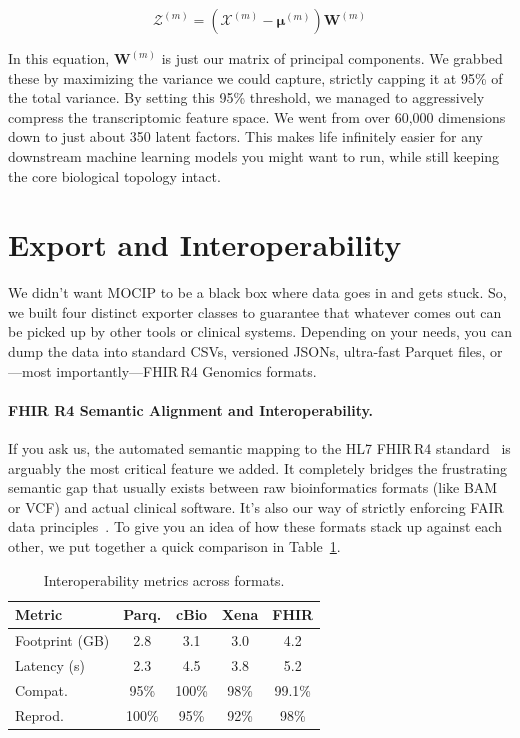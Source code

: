\documentclass[runningheads]{llncs}
\begin{document}
\begin{equation}
\mathcal{Z}^{(m)} = (\mathcal{X}^{(m)} - \mathbf{\mu}^{(m)}) \mathbf{W}^{(m)}
\end{equation}

In this equation, $\mathbf{W}^{(m)}$ is just our matrix of principal components. We grabbed these by maximizing the variance we could capture, strictly capping it at 95\% of the total variance. By setting this 95\% threshold, we managed to aggressively compress the transcriptomic feature space. We went from over 60,000 dimensions down to just about 350 latent factors. This makes life infinitely easier for any downstream machine learning models you might want to run, while still keeping the core biological topology intact.

\section{Export and Interoperability}

We didn't want MOCIP to be a black box where data goes in and gets stuck. So, we built four distinct exporter classes to guarantee that whatever comes out can be picked up by other tools or clinical systems. Depending on your needs, you can dump the data into standard CSVs, versioned JSONs, ultra-fast Parquet files, or---most importantly---FHIR\,R4 Genomics formats.

\paragraph{FHIR R4 Semantic Alignment and Interoperability.}
If you ask us, the automated semantic mapping to the HL7 FHIR\,R4 standard~\cite{hl7fhir} is arguably the most critical feature we added. It completely bridges the frustrating semantic gap that usually exists between raw bioinformatics formats (like BAM or VCF) and actual clinical software. It's also our way of strictly enforcing FAIR data principles~\cite{wilkinson2016}. To give you an idea of how these formats stack up against each other, we put together a quick comparison in Table~\ref{tab:export}.

\begin{table}[H]
\caption{Interoperability metrics across formats.}\label{tab:export}
\centering
\scriptsize
\setlength{\tabcolsep}{2pt}
\begin{tabular}{l c c c c}
\toprule
\textbf{Metric} & \textbf{Parq.} & \textbf{cBio} & \textbf{Xena} & \textbf{FHIR} \\
\midrule
Footprint (GB)      & 2.8   & 3.1   & 3.0   & 4.2 \\
Latency (s)         & 2.3   & 4.5   & 3.8   & 5.2 \\
Compat.             & 95\%  & 100\% & 98\%  & 99.1\% \\
Reprod.             & 100\% & 95\%  & 92\%  & 98\% \\
\bottomrule
\end{tabular}
\end{table}
\end{document}
